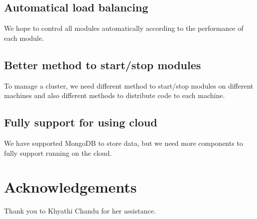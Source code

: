 \documentclass{article}
\begin{document}
    \subsection{Automatical load balancing}
    We hope to control all modules automatically according to the performance of each module.

    \subsection{Better method to start/stop modules}
    To manage a cluster, we need different method to start/stop modules on different machines and also different methods to distribute code to each machine.

    \subsection{Fully support for using cloud}
    We have supported MongoDB to store data, but we need more components to fully support running on the cloud.

\section*{Acknowledgements}
Thank you to Khyathi Chandu for her assistance.




\end{document}
